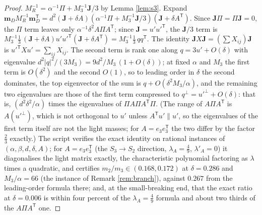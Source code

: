 \documentclass[11pt]{article}
\theoremstyle{definition}
\newcommand{\J}{\mathbf{J}}
\newcommand{\mD}{\mathbf{m}_{D}}
\begin{document}
\begin{proof}
$M_{R}^{-1} = \alpha^{-1}\Pi + M_{3}^{-1}\J/3$ by Lemma \ref{lem:s3}. Expand $\mD M_{R}^{-1}\mD^{\mathsf{T}} = d^{2}(\J + \delta A)(\alpha^{-1}\Pi + M_{3}^{-1}\J/3)(\J + \delta A^{\mathsf{T}})$. Since $\J\Pi = \Pi\J = 0$, the $\Pi$ term leaves only $\alpha^{-1}\delta^{2}A\Pi A^{\mathsf{T}}$; since $\J = u'u'^{\mathsf{T}}$, the $\J/3$ term is $M_{3}^{-1}\tfrac13\,(\J + \delta A)u'u'^{\mathsf{T}}(\J + \delta A^{\mathsf{T}}) = M_{3}^{-1}\tfrac13\,qq^{\mathsf{T}}$. The identity $\J X\J = (\sum X_{ij})\J$ is $u'^{\mathsf{T}}Xu' = \sum_{ij}X_{ij}$. The second term is rank one along $q = 3u' + O(\delta)$ with eigenvalue $d^{2}|q|^{2}/(3M_{3}) = 9d^{2}/M_{3}\,(1 + O(\delta))$; at fixed $\alpha$ and $M_{3}$ the first term is $O(\delta^{2})$ and the second $O(1)$, so to leading order in $\delta$ the second dominates, the top eigenvector of the sum is $q + O(\delta^{2}M_{3}/\alpha)$, and the remaining two eigenvalues are those of the first term compressed to $q^{\perp} = u'^{\perp} + O(\delta)$: that is, $(d^{2}\delta^{2}/\alpha)$ times the eigenvalues of $\Pi A\Pi A^{\mathsf{T}}\Pi$. (The range of $A\Pi A^{\mathsf{T}}$ is $A(u'^{\perp})$, which is not orthogonal to $u'$ unless $A^{\mathsf{T}}u' \parallel u'$, so the eigenvalues of the first term itself are not the light masses; for $A = e_{3}e_{3}^{\mathsf{T}}$ the two differ by the factor $\tfrac23$ exactly.) The script verifies the exact identity on rational instances of $(\alpha, \beta, d, \delta, A)$; for $A = e_{3}e_{3}^{\mathsf{T}}$ (the $S_{3} \to S_{2}$ direction, $\lambda_{A} = \tfrac49$, $\lambda'_{A} = 0$) it diagonalises the light matrix exactly, the characteristic polynomial factoring as $\lambda$ times a quadratic, and certifies $m_{2}/m_{3} \in (0.168, 0.172)$ at $\delta = 0.286$ and $M_{3}/\alpha = 66$ (the instance of Remark \ref{rem:branch}), against $0.267$ from the leading-order formula there; and, at the small-breaking end, that the exact ratio at $\delta = 0.006$ is within four percent of the $\lambda_{A} = \tfrac49$ formula and about two thirds of the $A\Pi A^{\mathsf{T}}$ one.
\end{proof}
\end{document}
